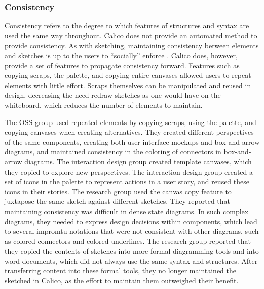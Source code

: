 %

\subsubsection{Consistency}
Consistency refers to the degree to which features of structures and syntax are used the same way throughout. Calico does not provide an automated method to provide consistency. As with sketching, maintaining consistency between elements and sketches is up to the users to ``socially'' enforce \cite{Petre2013BookChapter}. Calico does, however, provide a set of features to propagate consistency forward. Features such as copying scraps, the palette, and copying entire canvases allowed users to repeat elements with little effort. Scraps themselves can be manipulated and reused in design, decreasing the need redraw sketches as one would have on the whiteboard, which reduces the number of elements to maintain.

The OSS group used repeated elements by copying scraps, using the palette, and copying canvases when creating alternatives. They created different perspectives of the same components, creating both user interface mockups and box-and-arrow diagrams, and maintained consistency in the coloring of connectors in box-and-arrow diagrams. The interaction design group created template canvases, which they copied to explore new perspectives. The interaction design group created a set of icons in the palette to represent actions in a user story, and reused these icons in their stories. The research group used the canvas copy feature to juxtapose the same sketch against different sketches. They reported that maintaining consistency was difficult in dense state diagrams. In such complex diagrams, they needed to express design decisions within components, which lead to several impromtu notations that were not consistent with other diagrams, such as colored connectors and colored underlines. The research group reported that they copied the contents of sketches into more formal diagramming tools and into word documents, which did not always use the same syntax and structures. After transferring content into these formal tools, they no longer maintained the sketched in Calico, as the effort to maintain them outweighed their benefit.

